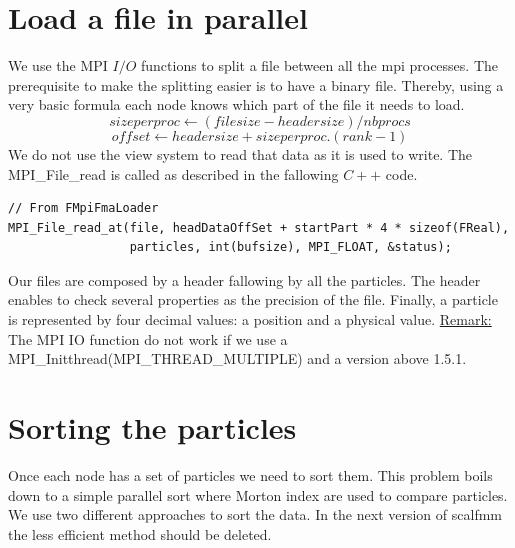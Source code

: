 \documentclass[12pt,letterpaper,titlepage]{report}
\begin{document}
\section{Load a file in parallel}
We use the MPI $I/O$ functions to split a file between all the mpi processes.
The prerequisite to make the splitting easier is to have a binary file.
Thereby, using a very basic formula each node knows which part of the file it needs to load.
\begin{equation}
size per proc \leftarrow \left (file size - header size \right ) / nbprocs
\end{equation}
\begin{equation}
offset \leftarrow header size + size per proc .\left ( rank - 1 \right )
\end{equation}
\newline
We do not use the view system to read that data as it is used to write. The MPI\_File\_read is called as described in the fallowing $C++$ code.
\begin{lstlisting}
// From FMpiFmaLoader
MPI_File_read_at(file, headDataOffSet + startPart * 4 * sizeof(FReal),
                 particles, int(bufsize), MPI_FLOAT, &status);
\end{lstlisting}
Our files are composed by a header fallowing by all the particles.
The header enables to check several properties as the precision of the file.
Finally, a particle is represented by four decimal values: a position and a physical value.
\newline
\underline{Remark:} The MPI IO function do not work if we use a MPI\_Initthread(MPI\_THREAD\_MULTIPLE) and a version above 1.5.1.

\section{Sorting the particles}
Once each node has a set of particles we need to sort them.
This problem boils down to a simple parallel sort where Morton index are used to compare particles.
We use two different approaches to sort the data.
In the next version of scalfmm the less efficient method should be deleted.
\end{document}
